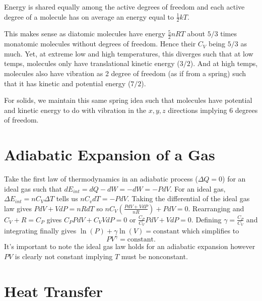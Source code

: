\begin{definition}
    Energy is shared equally among the active degrees of freedom and each active degree of a molecule has on average an energy equal to $\frac{1}{2}kT.$
\end{definition}
\begin{note}
    This makes sense as diatomic molecules have energy $\frac{5}{2}nRT$ about $5/3$ times monatomic molecules without degrees of freedom. Hence their $C_V$ being $5/3$ as much. Yet, at extreme low and high temperatures, this diverges such that at low temps, molecules only have translational kinetic energy ($3/2$). And at high temps, molecules also have vibration as 2 degree of freedom (as if from a spring) such that it has kinetic and potential energy ($7/2$). 
\end{note}
\begin{note}
    For solids, we maintain this same spring idea such that molecules have potential and kinetic energy to do with vibration in the $x,y,z$ directions implying 6 degrees of freedom.
\end{note}

\section{Adiabatic Expansion of a Gas}

\begin{remark}
    Take the first law of thermodynamics in an adiabatic process  ($\Delta Q = 0$) for an ideal gas such that $dE_{int} = dQ-dW = -dW = -PdV$. For an ideal gas, $\Delta E_{int} = nC_V\Delta T$ tells us $nC_vdT = -PdV$. Taking the differential of the ideal gas law gives $PdV + VdP = nRdT$ so $nC_V(\frac{PdV+VdP}{nR}) + PdV = 0.$ Rearranging and $C_V+R = C_P$ gives $C_PPdV + C_VVdP = 0$ or $\frac{C_P}{C_V}PdV+VdP=0$. Defining $\gamma = \frac{C_P}{C_V}$ and integrating finally gives $\ln(P)+\gamma\ln(V) = \text{constant}$ which simplifies to $$PV^\gamma = \text{constant}.$$ It's important to note the ideal gas law holds for an adiabatic expansion however $PV$ is clearly not constant implying $T$ must be nonconstant.
\end{remark}

\section{Heat Transfer}

